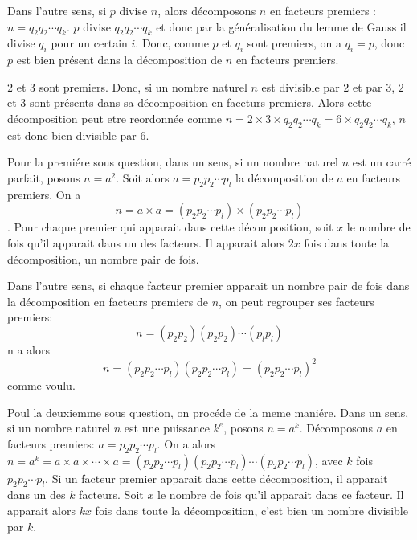 Dans l'autre sens, si \(p\) divise \(n\), alors décomposons \(n\) en facteurs premiers : \(n = q_2 q_2 \cdots q_{k}\). \(p\) divise \(q_2 q_2 \cdots q_{k}\) et donc par la généralisation du lemme de Gauss il divise \(q_{i}\) pour un certain \(i\). Donc, comme \(p\) et \(q_{i}\) sont premiers, on a \(q_{i} = p\), donc \(p\) est bien présent dans la décomposition de \(n\) en facteurs premiers.

\sol

\(2\) et \(3\) sont premiers. Donc, si un nombre naturel \(n\) est divisible par \(2\) et par \(3\), \(2\) et \(3\) sont présents dans sa décomposition en faceturs premiers. Alors cette décomposition peut etre reordonnée comme \(n = 2 \times 3 \times q_2 q_2 \cdots q_{k} = 6 \times q_2 q_2 \cdots q_{k}\), \(n\) est donc bien divisible par \(6\).

\sol

Pour la premiére sous question, dans un sens, si un nombre naturel \(n\) est un carré parfait, posons \(n = a^2\). Soit alors \(a = p_2 p_2 \cdots p_{l}\) la décomposition de \(a\) en facteurs premiers. On a
\[n = a \times a = \left(p_2 p_2 \cdots p_{l}\right) \times \left(p_2 p_2 \cdots p_{l}\right)\]. Pour chaque premier qui apparait dans cette décomposition, soit \(x\) le nombre de fois qu'il apparait dans un des facteurs. Il apparait alors \(2x\) fois dans toute la décomposition, un nombre pair de fois.

Dans l'autre sens, si chaque facteur premier apparait un nombre pair de fois dans la décomposition en facteurs premiers de \(n\), on peut regrouper ses facteurs premiers:
\[n = \left(p_2 p_2\right)\left(p_2 p_2\right) \cdots \left(p_{l} p_{l}\right)\]
n a alors
\[n = \left(p_2 p_2 \cdots p_{l}\right) \left(p_2 p_2 \cdots p_{l}\right) = \left(p_2 p_2 \cdots p_{l}\right)^2\]
comme voulu.

Poul la deuxiemme sous question, on procéde de la meme maniére.
Dans un sens, si un nombre naturel \(n\) est
une puissance \(k^{e}\), posons \(n=a^{k}\).
Décomposons \(a\) en facteurs premiers: \(a = p_2 p_2 \cdots p_{l}\). On a alors \(n = a^{k} = a \times a \times \cdots \times a = \left(p_2 p_2 \cdots p_{l}\right) \left(p_2 p_2 \cdots p_{l}\right) \cdots \left(p_2 p_2 \cdots p_{l}\right)\), avec \(k\) fois \(p_2 p_2 \cdots p_{l}\). Si un facteur premier apparait dans cette décomposition, il apparait dans un des \(k\) facteurs. Soit \(x\) le nombre de fois qu'il apparait dans ce facteur. Il apparait alors \(kx\) fois dans toute la décomposition, c'est bien un nombre divisible par \(k\).

